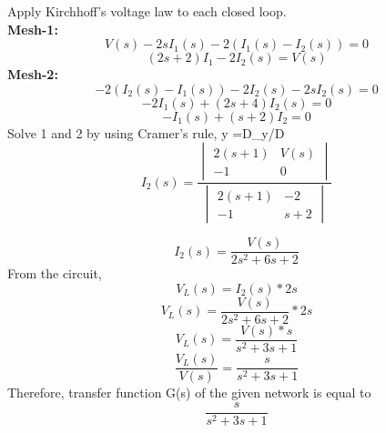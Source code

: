 \documentclass{beamer}
\begin{document}

\begin{frame}
Apply Kirchhoff's voltage law to each closed loop.\\
\textbf{Mesh-1:}\\
   

\begin{equation}
    V(s) - 2sI_1(s)-2(I_1(s)-I_2(s))=0\nonumber
\end{equation}
\begin{equation}
    (2s+2)I_1 - 2I_2(s)=V(s)
\end{equation}
\textbf{Mesh-2:}\\
\begin{equation}
    -2(I_2(s)- I_1(s)) -2I_2(s)-2sI_2(s)=0\nonumber
\end{equation}
\begin{equation}
   -2I_1(s) + (2s+4)I_2(s)=0\nonumber
\end{equation}
\begin{equation}
    -I_1(s) + (s+2)I_2=0
\end{equation}
Solve 1 and 2 by using Cramer's rule, y =D_y/D \\
\begin{equation}
    I_2(s)= \frac{\begin{vmatrix} 2(s+1) & V(s) \\ -1 & 0 \end{vmatrix}}{\begin{vmatrix} 2(s+1)  &  -2 \\  -1 & s+2 \end{vmatrix}} \nonumber
\end{equation}
\end{frame}


\begin{frame}
\begin{equation}
    I_2(s)=\frac{V(s)}{2s^2 + 6s +2}\nonumber
\end{equation}
From the circuit,
\begin{equation}
    V_L(s)=I_2(s)*2s\nonumber
\end{equation}
\begin{equation}
    V_L(s)=\frac{V(s)}{2s^2 + 6s +2}*2s\nonumber
\end{equation}
\begin{equation}
    V_L(s)=\frac{V(s)*s}{s^2 + 3s +1 }\nonumber
\end{equation}
\begin{equation}
  \frac{V_L(s)}{V(s)}= \frac{s}{s^2 + 3s + 1} \nonumber
\end{equation}
Therefore, transfer function G(s) of the given network is equal to 
\begin{equation}
  \frac{s}{s^2 + 3s + 1} \nonumber
\end{equation}
\end{frame}
\end{document}
